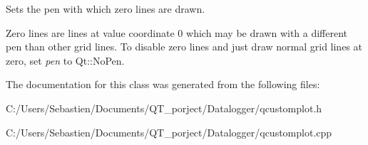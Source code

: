 Sets the pen with which zero lines are drawn.

Zero lines are lines at value coordinate 0 which may be drawn with a different pen than other grid lines. To disable zero lines and just draw normal grid lines at zero, set {\itshape pen} to Qt\+::\+No\+Pen. 

The documentation for this class was generated from the following files\+:\begin{DoxyCompactItemize}
\item 
C\+:/\+Users/\+Sebastien/\+Documents/\+Q\+T\+\_\+porject/\+Datalogger/qcustomplot.\+h\item 
C\+:/\+Users/\+Sebastien/\+Documents/\+Q\+T\+\_\+porject/\+Datalogger/qcustomplot.\+cpp\end{DoxyCompactItemize}
